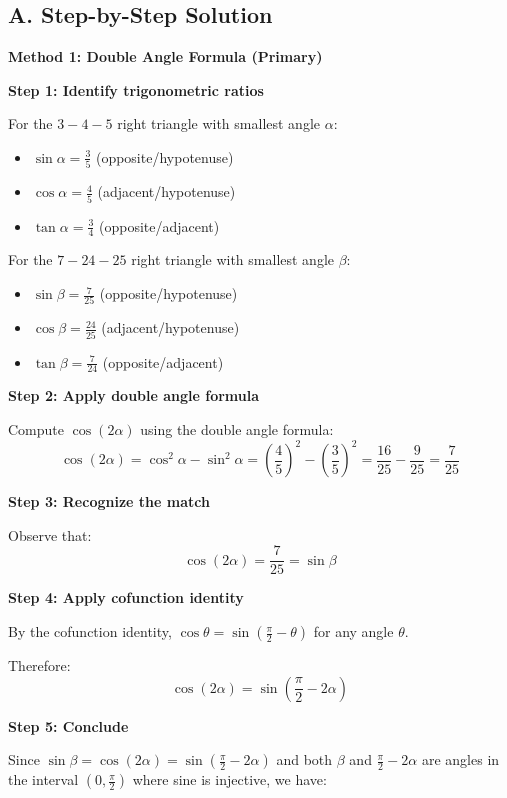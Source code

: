 \documentclass[11pt]{article}
\begin{document}
\begin{solutionbox}
\subsection*{A. Step-by-Step Solution}

\textbf{Method 1: Double Angle Formula (Primary)}

\textbf{Step 1: Identify trigonometric ratios}

For the $3{-}4{-}5$ right triangle with smallest angle $\alpha$:
\begin{itemize}
    \item $\sin\alpha = \frac{3}{5}$ (opposite/hypotenuse)
    \item $\cos\alpha = \frac{4}{5}$ (adjacent/hypotenuse)
    \item $\tan\alpha = \frac{3}{4}$ (opposite/adjacent)
\end{itemize}

For the $7{-}24{-}25$ right triangle with smallest angle $\beta$:
\begin{itemize}
    \item $\sin\beta = \frac{7}{25}$ (opposite/hypotenuse)
    \item $\cos\beta = \frac{24}{25}$ (adjacent/hypotenuse)
    \item $\tan\beta = \frac{7}{24}$ (opposite/adjacent)
\end{itemize}

\textbf{Step 2: Apply double angle formula}

Compute $\cos(2\alpha)$ using the double angle formula:
\[
\cos(2\alpha) = \cos^2\alpha - \sin^2\alpha = \left(\frac{4}{5}\right)^2 - \left(\frac{3}{5}\right)^2 = \frac{16}{25} - \frac{9}{25} = \frac{7}{25}
\]

\textbf{Step 3: Recognize the match}

Observe that:
\[
\cos(2\alpha) = \frac{7}{25} = \sin\beta
\]

\textbf{Step 4: Apply cofunction identity}

By the cofunction identity, $\cos\theta = \sin\left(\frac{\pi}{2} - \theta\right)$ for any angle $\theta$.

Therefore:
\[
\cos(2\alpha) = \sin\left(\frac{\pi}{2} - 2\alpha\right)
\]

\textbf{Step 5: Conclude}

Since $\sin\beta = \cos(2\alpha) = \sin\left(\frac{\pi}{2} - 2\alpha\right)$ and both $\beta$ and $\frac{\pi}{2} - 2\alpha$ are angles in the interval $(0, \frac{\pi}{2})$ where sine is injective, we have:


\end{solutionbox}
\end{document}
